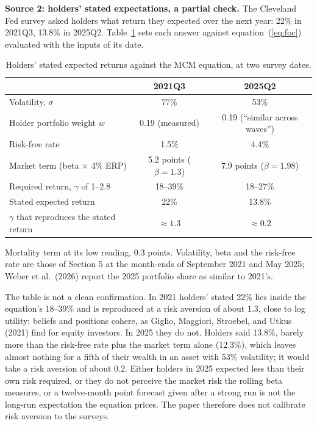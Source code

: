 \documentclass[11pt]{article}
\begin{document}
\textbf{Source 2: holders' stated expectations, a partial check.} The Cleveland Fed survey asked holders what return they expected over the next year: 22\% in 2021Q3, 13.8\% in 2025Q2. Table~\ref{tab:gamma} sets each answer against equation~(\ref{eq:foc}) evaluated with the inputs of its date.

\begin{table}[ht]\centering\small
\caption{Holders' stated expected returns against the MCM equation, at two survey dates.}
\label{tab:gamma}
\begin{tabular}{lcc}
\toprule
 & 2021Q3 & 2025Q2 \\
\midrule
Volatility, $\sigma$ & 77\% & 53\% \\
Holder portfolio weight $w$ & 0.19 (measured) & 0.19 (``similar across waves'') \\
Risk-free rate & 1.5\% & 4.4\% \\
Market term (beta $\times$ 4\% ERP) & 5.2 points ($\beta = 1.3$) & 7.9 points ($\beta = 1.98$) \\
Required return, $\gamma$ of 1--2.8 & 18--39\% & 18--27\% \\
Stated expected return & 22\% & 13.8\% \\
$\gamma$ that reproduces the stated return & $\approx 1.3$ & $\approx 0.2$ \\
\bottomrule
\end{tabular}
\par\smallskip\parbox{0.9\textwidth}{\footnotesize Mortality term at its low reading, 0.3 points. Volatility, beta and the risk-free rate are those of Section 5 at the month-ends of September 2021 and May 2025; Weber et al.\ (2026) report the 2025 portfolio share as similar to 2021's. }
\end{table}

The table is not a clean confirmation. In 2021 holders' stated 22\% lies inside the equation's 18--39\% and is reproduced at a risk aversion of about 1.3, close to log utility: beliefs and positions cohere, as Giglio, Maggiori, Stroebel, and Utkus (2021) find for equity investors. In 2025 they do not. Holders said 13.8\%, barely more than the risk-free rate plus the market term alone (12.3\%), which leaves almost nothing for a fifth of their wealth in an asset with 53\% volatility; it would take a risk aversion of about 0.2. Either holders in 2025 expected less than their own risk required, or they do not perceive the market risk the rolling beta measures, or a twelve-month point forecast given after a strong run is not the long-run expectation the equation prices. The paper therefore does not calibrate risk aversion to the surveys.
\end{document}
